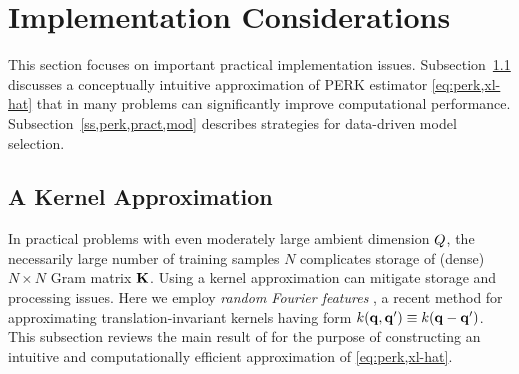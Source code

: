 \section{Implementation Considerations}
\label{s,perk,pract}

This section focuses 
on important practical implementation issues.
Subsection~\ref{ss,perk,pract,apprx} discusses
a conceptually intuitive approximation
of PERK estimator \eqref{eq:perk,xl-hat}
that in many problems
can significantly improve computational performance.
Subsection~\ref{ss,perk,pract,mod} describes strategies 
for data-driven model selection.

\subsection{A Kernel Approximation}
\label{ss,perk,pract,apprx}

In practical problems
with even moderately large ambient dimension $Q$,
the necessarily large number of training samples $N$ 
complicates storage of (dense) $N\times N$ Gram matrix $\mathbf{K}$.
Using a kernel approximation 
can mitigate storage and processing issues.
Here we employ \emph{random Fourier features} \cite{rahimi:07:rff},
a recent method 
for approximating translation-invariant kernels
having form $k\paren{\bmq,\bmq'} \equiv k\paren{\bmq-\bmq'}$.
This subsection reviews the main result of \cite{rahimi:07:rff}
for the purpose of constructing 
an intuitive and computationally efficient approximation 
of \eqref{eq:perk,xl-hat}.

